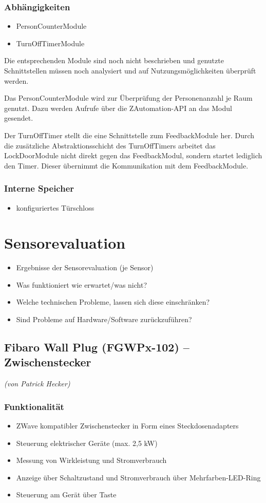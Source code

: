 \subsubsection{Abhängigkeiten}
\begin{itemize}
	\item PersonCounterModule
	\item TurnOffTimerModule
\end{itemize}
Die entsprechenden Module sind noch nicht beschrieben und genutzte Schnittstellen müssen noch analysiert und auf Nutzungsmöglichkeiten überprüft werden.

Das PersonCounterModule wird zur Überprüfung der Personenanzahl je Raum genutzt. Dazu werden Aufrufe über die ZAutomation-API an das Modul gesendet.

Der TurnOffTimer stellt die eine Schnittstelle zum FeedbackModule her. Durch die zusätzliche Abstraktionsschicht des TurnOffTimers arbeitet das LockDoorModule nicht direkt gegen das FeedbackModul, sondern startet lediglich den Timer. Dieser übernimmt die Kommunikation mit dem FeedbackModule.


\subsubsection{Interne Speicher}
\begin{itemize}
	\item konfiguriertes Türschloss
\end{itemize}

\section{Sensorevaluation}
\begin{itemize}
	\item Ergebnisse der Sensorevaluation (je Sensor)
	\item Was funktioniert wie erwartet/was nicht?
	\item Welche technischen Probleme, lassen sich diese einschränken?
	\item Sind Probleme auf Hardware/Software zurückzuführen?
\end{itemize}

\subsection{Fibaro Wall Plug (FGWPx-102) – Zwischenstecker}

\emph{(von Patrick Hecker)}
\subsubsection{Funktionalität}
\begin{itemize}
	\item ZWave kompatibler Zwischenstecker in Form eines Steckdosenadapters
	\item Steuerung elektrischer Geräte (max. 2,5 kW)
	\item Messung von Wirkleistung und Stromverbrauch
	\item Anzeige über Schaltzustand und Stromverbrauch über Mehrfarben-LED-Ring
	\item Steuerung am Gerät über Taste
\end{itemize}
